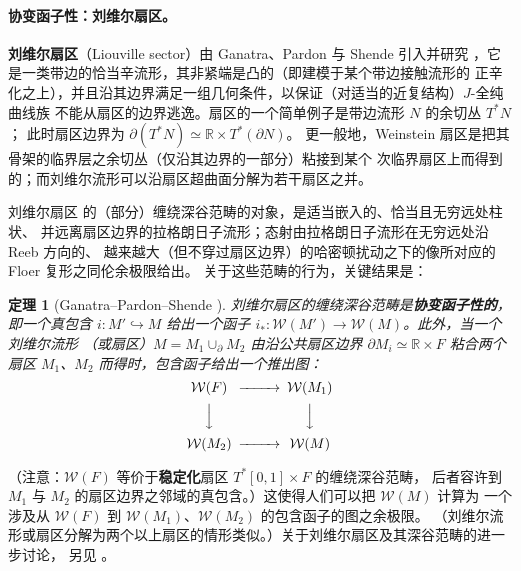\documentclass[UTF8,a4paper,11pt,fontset=windows]{ctexart}
\theoremstyle{cnthm}
\newtheorem{thm}{定理}[section]
\numberwithin{equation}{section}
\newcommand{\R}{\mathbb{R}}
\newcommand{\WW}{\mathcal{W}}         %
\begin{document}
\paragraph{协变函子性：刘维尔扇区。}
\textbf{刘维尔扇区}（Liouville sector）由 Ganatra、Pardon 与 Shende 引入并研究
\cite{r56,r57}，它是一类带边的恰当辛流形，其非紧端是凸的（即建模于某个带边接触流形的
正辛化之上），并且沿其边界满足一组几何条件，以保证（对适当的近复结构）$J$-全纯曲线族
不能从扇区的边界逃逸。扇区的一个简单例子是带边流形 $N$ 的余切丛 $T^{*}N$；
此时扇区边界为 $\partial(T^{*}N)\simeq\R\times T^{*}(\partial N)$。
更一般地，Weinstein 扇区是把其骨架的临界层之余切丛（仅沿其边界的一部分）粘接到某个
次临界扇区上而得到的；而刘维尔流形可以沿扇区超曲面分解为若干扇区之并。

刘维尔扇区 \cite{r56} 的（部分）缠绕深谷范畴的对象，是适当嵌入的、恰当且无穷远处柱状、
并远离扇区边界的拉格朗日子流形；态射由拉格朗日子流形在无穷远处沿 Reeb 方向的、
越来越大（但不穿过扇区边界）的哈密顿扰动之下的像所对应的 Floer 复形之同伦余极限给出。
关于这些范畴的行为，关键结果是：

\begin{thm}[Ganatra--Pardon--Shende \cite{r56,r57}]\label{thm:3.1}
刘维尔扇区的缠绕深谷范畴是\textbf{协变函子性的}，即一个真包含
$i:M'\hookrightarrow M$ 给出一个函子 $i_{*}:\WW(M')\to\WW(M)$。此外，当一个刘维尔流形
（或扇区）$M=M_1\cup_{\partial}M_2$ 由沿公共扇区边界
$\partial M_i\simeq\R\times F$ 粘合两个扇区 $M_1$、$M_2$ 而得时，包含函子给出一个推出图：
\begin{equation}\label{eq:3.2}
\begin{CD}
\WW(F)  @>>>  \WW(M_1)\\
@VVV        @VVV\\
\WW(M_2) @>>> \WW(M)
\end{CD}
\end{equation}
\end{thm}

（注意：$\WW(F)$ 等价于\textbf{稳定化}扇区 $T^{*}[0,1]\times F$ 的缠绕深谷范畴，
后者容许到 $M_1$ 与 $M_2$ 的扇区边界之邻域的真包含。）这使得人们可以把 $\WW(M)$ 计算为
一个涉及从 $\WW(F)$ 到 $\WW(M_1)$、$\WW(M_2)$ 的包含函子的图之余极限。
（刘维尔流形或扇区分解为两个以上扇区的情形类似。）关于刘维尔扇区及其深谷范畴的进一步讨论，
另见 \cite{r54}。

\end{document}
